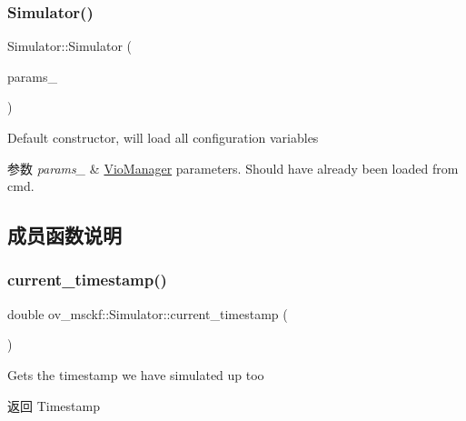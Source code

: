 \subsubsection{\texorpdfstring{Simulator()}{Simulator()}}
{\footnotesize\ttfamily Simulator\+::\+Simulator (\begin{DoxyParamCaption}\item[{\hyperlink{structov__msckf_1_1VioManagerOptions}{Vio\+Manager\+Options} \&}]{params\+\_\+ }\end{DoxyParamCaption})}



Default constructor, will load all configuration variables 


\begin{DoxyParams}{参数}
{\em params\+\_\+} & \hyperlink{classov__msckf_1_1VioManager}{Vio\+Manager} parameters. Should have already been loaded from cmd. \\
\hline
\end{DoxyParams}


\subsection{成员函数说明}
\mbox{\label{classov__msckf_1_1Simulator_a10fbc2c949b380e152a3b9097b5b6643}} 
\subsubsection{\texorpdfstring{current\+\_\+timestamp()}{current\_timestamp()}}
{\footnotesize\ttfamily double ov\+\_\+msckf\+::\+Simulator\+::current\+\_\+timestamp (\begin{DoxyParamCaption}{ }\end{DoxyParamCaption})\hspace{0.3cm}{\ttfamily [inline]}}



Gets the timestamp we have simulated up too 

\begin{DoxyReturn}{返回}
Timestamp 
\end{DoxyReturn}
\mbox{\label{classov__msckf_1_1Simulator_a511b2edf20545972ced008fddb0654ae}} 
